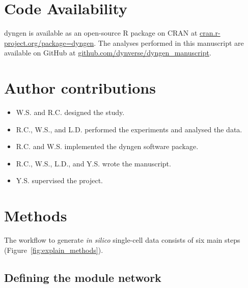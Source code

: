 \documentclass[
  table,
  10pt,
  a4paper]{article}
\providecommand{\tightlist}{%
  \setlength{\itemsep}{0pt}\setlength{\parskip}{0pt}}
\providecommand{\DIFaddend}{} %
\providecommand{\DIFdelbegin}{} %
\providecommand{\DIFdelend}{} %
\newcommand{\DIFscaledelfig}{0.5}
\newlength{\DIFdelgraphicswidth} %
\newlength{\DIFdelgraphicsheight} %
\newcommand{\DIFdelincludegraphics}[2][]{%
\sbox{\DIFdelgraphicsbox}{\DIFOincludegraphics[#1]{#2}}%
\settoboxwidth{\DIFdelgraphicswidth}{\DIFdelgraphicsbox} %
\settoboxtotalheight{\DIFdelgraphicsheight}{\DIFdelgraphicsbox} %
\scalebox{\DIFscaledelfig}{%
\parbox[b]{\DIFdelgraphicswidth}{\usebox{\DIFdelgraphicsbox}\\[-\baselineskip] \rule{\DIFdelgraphicswidth}{0em}}\llap{\resizebox{\DIFdelgraphicswidth}{\DIFdelgraphicsheight}{%
\setlength{\unitlength}{\DIFdelgraphicswidth}%
\begin{picture}(1,1)%
\thicklines\linethickness{2pt} %
{\color[rgb]{1,0,0}\put(0,0){\framebox(1,1){}}}%
{\color[rgb]{1,0,0}\put(0,0){\line( 1,1){1}}}%
{\color[rgb]{1,0,0}\put(0,1){\line(1,-1){1}}}%
\end{picture}%
}\hspace*{3pt}}} %
} %
\DeclareRobustCommand{\DIFaddend}{\DIFOaddend \let\includegraphics\DIFOincludegraphics} %
\DeclareRobustCommand{\DIFdelbegin}{\DIFOdelbegin \let\includegraphics\DIFdelincludegraphics} %
\DeclareRobustCommand{\DIFdelend}{\DIFOaddend \let\includegraphics\DIFOincludegraphics} %
\begin{document}
\hypertarget{code-availability}{%
\section{Code Availability}\label{code-availability}}

\DIFaddend dyngen is available as an open-source R package on CRAN at
\href{https://cran.r-project.org/package=dyngen}{cran.r-project.org/package=dyngen}.
The analyses performed in this manuscript are available on GitHub at
\href{https://github.com/dynverse/dyngen_manuscript}{github.com/dynverse/dyngen\_manuscript}.

\hypertarget{author-contributions}{%
\section{Author contributions}\label{author-contributions}}

\begin{itemize}
\tightlist
\item
  W.S. and R.C. designed the study.
\item
  R.C., W.S., and L.D. performed the experiments and analysed the data.
\item
  R.C. and W.S. implemented the dyngen software package.
\item
  R.C., W.S., L.D., and Y.S. wrote the manuscript.
\item
  Y.S. supervised the project.
\end{itemize}

\DIFdelbegin %
\DIFdelend \newpage

\hypertarget{sec:dyngen-methods}{%
\section{Methods}\label{sec:dyngen-methods}}

The workflow to generate \emph{in silico} single-cell data consists of
six main steps (Figure~\ref{fig:explain_methods}).

\hypertarget{sec:dyngen-modules}{%
\subsection{Defining the module network}\label{sec:dyngen-modules}}
\end{document}

